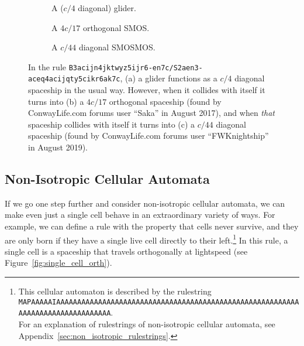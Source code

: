 \begin{figure}[!htb]
	\centering
	\begin{subfigure}{.32\textwidth}
		\centering
		\caption{A ($c/4$ diagonal) glider.}
		\label{fig:smos_glider}
	\end{subfigure} \hfill %
	\begin{subfigure}{.32\textwidth}
		\centering
		\caption{A $4c/17$ orthogonal SMOS.}
		\label{fig:smos_smos}
	\end{subfigure} \hfill %
	\begin{subfigure}{.32\textwidth}
		\centering
		\caption{A $c/44$ diagonal SMOSMOS.}
		\label{fig:smos_smosmos}
	\end{subfigure}
	\caption{In the rule \texttt{B3acijn4jktwyz5ijr6-en7c/S2aen3-aceq4acijqty5cikr6ak7c}, (a) a glider functions as a $c/4$ diagonal spaceship in the usual way. However, when it collides with itself it turns into (b) a $4c/17$ orthogonal spaceship (found by ConwayLife.com forums user ``Saka'' in August 2017), and when \emph{that} spaceship collides with itself it turns into (c) a $c/44$ diagonal spaceship (found by ConwayLife.com forums user ``FWKnightship'' in August 2019).}\label{fig:smos}
\end{figure}


\subsection{Non-Isotropic Cellular Automata}\label{sec:non_isotropic_rules}

If we go one step further and consider non-isotropic cellular automata, we can make even just a single cell behave in an extraordinary variety of ways. For example, we can define a rule with the property that cells never survive, and they are only born if they have a single live cell directly to their left.\footnote{This cellular automaton is described by the rulestring\protect\\\texttt{MAPAAAAAIAAAAAAAAAAAAAAAAAAAAAAAAAAAAAAAAAAAAAAAAAAAAAAAAAAAAAAAAAAAAAAAAAAAAAAAAAAAAAAAA}.\protect\\ For an explanation of rulestrings of non-isotropic cellular automata, see Appendix~\ref{sec:non_isotropic_rulestrings}.} In this rule, a single cell is a spaceship that travels orthogonally at lightspeed (see Figure~\ref{fig:single_cell_orth}).

